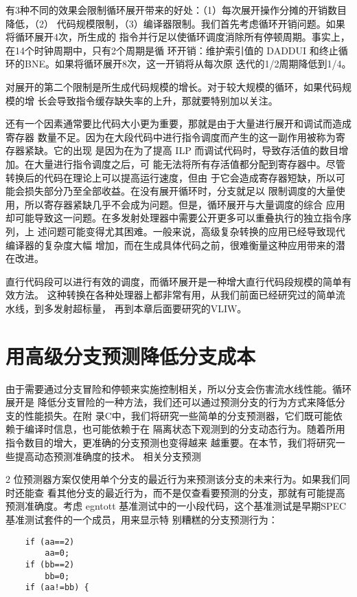 有3种不同的效果会限制循环展开带来的好处：（1）每次展开操作分摊的开销数目降低，（2）
代码规模限制，（3）编译器限制。我们首先考虑循环开销问题。如果将循环展开4次，所生成的
指令并行足以使循环调度消除所有停顿周期。事实上，在14个时钟周期中，只有2个周期是循
环开销：维护索引值的 DADDUI 和终止循环的BNE。如果将循环展开8次，这一开销将从每次原
迭代的1/2周期降低到1/4。

对展开的第二个限制是所生成代码规模的增长。对于较大规模的循环，如果代码规模的增
长会导致指令缓存缺失率的上升，那就要特别加以关注。

还有一个因素通常要比代码大小更为重要，那就是由于大量进行展开和调试而造成寄存器
数量不足。因为在大段代码中进行指令调度而产生的这一副作用被称为寄存器紧缺。它的出现
是因为在为了提高 ILP 而调试代码时，导致存活值的数目增加。在大量进行指令调度之后，可
能无法将所有存活值都分配到寄存器中。尽管转换后的代码在理论上可以提高运行速度，但由
于它会造成寄存器短缺，所以可能会损失部分乃至全部收益。在没有展开循环时，分支就足以
限制调度的大量使用，所以寄存器紧缺几乎不会成为问题。但是，循环展开与大量调度的综合
应用却可能导致这一问题。在多发射处理器中需要公开更多可以重叠执行的独立指令序列，上
述问题可能变得尤其困难。一般来说，高级复杂转换的应用已经导致现代编译器的复杂度大幅
增加，而在生成具体代码之前，很难衡量这种应用带来的潜在改进。

直行代码段可以进行有效的调度，而循环展开是一种增大直行代码段规模的简单有效方法。
这种转换在各种处理器上都非常有用，从我们前面已经研究过的简单流水线，到多发射超标量，
再到本章后面要研究的VLIW。

\section{用高级分支预测降低分支成本}
由于需要通过分支冒险和停顿来实施控制相关，所以分支会伤害流水线性能。循环展开是
降低分支冒险的一种方法，我们还可以通过预测分支的行为方式来降低分支的性能损失。在附
录C中，我们将研究一些简单的分支预测器，它们既可能依赖于编译时信息，也可能依赖于在
隔离状态下观测到的分支动态行为。随着所用指令数目的增大，更准确的分支预测也变得越来
越重要。在本节，我们将研究一些提高动态预测准确度的技术。
相关分支预测

2 位预测器方案仅使用单个分支的最近行为来预测该分支的未来行为。如果我们同时还能查
看其他分支的最近行为，而不是仅查看要预测的分支，那就有可能提高预测准确度。考虑 egntott
基准测试中的一小段代码，这个基准测试是早期SPEC 基准测试套件的一个成员，用来显示特
别糟糕的分支预测行为：

\begin{verbatim}
    if (aa==2)
        aa=0;
    if (bb==2)
        bb=0;
    if (aa!=bb) {
\end{verbatim}

